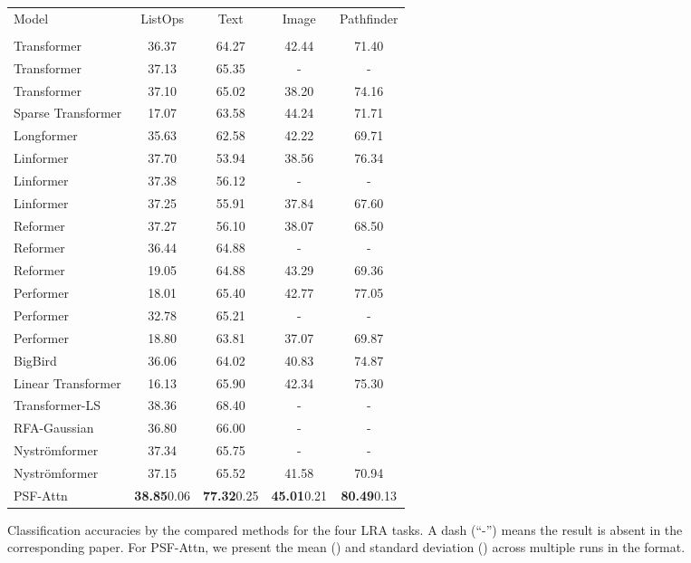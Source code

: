 \documentclass{article}
\begin{document}
\begin{figure}[t]
\begin{center}
\setlength\tabcolsep{5pt}
\begin{table*}[t]
\centering
\caption{Classification accuracies by the compared methods for the four LRA tasks. A dash (``-'') means the result is absent in the corresponding paper. For PSF-Attn, we present the mean () and standard deviation () across multiple runs in the  format.}
\label{tab:LRAacc}
\begin{tabular}{lcccc}
\hline\hline
Model              & ListOps & Text & Image & Pathfinder\\
                   &  &  &  & \\
\hline
Transformer \citep{tay2020long}    & 36.37 & 64.27 & 42.44 & 71.40\\
Transformer  \citep{zhu2021long}   & 37.13 & 65.35 & -     & -    \\
Transformer \citep{xiong2021nystr}    & 37.10 & 65.02 & 38.20 & 74.16\\
\hline
Sparse Transformer \citep{tay2020long}   & 17.07 & 63.58 & 44.24 & 71.71\\
\hline
Longformer \citep{tay2020long}     & 35.63 & 62.58 & 42.22 & 69.71\\
\hline
Linformer \citep{tay2020long}      & 37.70 & 53.94 & 38.56 & 76.34\\
Linformer \citep{zhu2021long}      & 37.38 & 56.12 & -     & -    \\
Linformer \citep{xiong2021nystr}      & 37.25 & 55.91 & 37.84 & 67.60\\
\hline
Reformer \citep{tay2020long}       & 37.27 & 56.10 & 38.07 & 68.50\\
Reformer \citep{zhu2021long}       & 36.44 & 64.88 & -     & -    \\
Reformer \citep{xiong2021nystr}       & 19.05 & 64.88 & 43.29 & 69.36\\
\hline
Performer \citep{tay2020long}      & 18.01 & 65.40 & 42.77 & 77.05\\
Performer \citep{zhu2021long}      & 32.78 & 65.21 & -     & -    \\
Performer \citep{xiong2021nystr}      & 18.80 & 63.81 & 37.07 & 69.87\\
\hline
BigBird \citep{tay2020long}        & 36.06 & 64.02 & 40.83 & 74.87\\
\hline
Linear Transformer \citep{tay2020long}  & 16.13 & 65.90 & 42.34 & 75.30\\
\hline
Transformer-LS \citep{zhu2021long} & 38.36 & 68.40 & -     & -    \\
\hline
RFA-Gaussian \citep{peng2021random}   & 36.80 & 66.00 & -     & -    \\
\hline
Nystr\"omformer \citep{zhu2021long}  & 37.34 & 65.75 & -     & -    \\
Nystr\"omformer \citep{xiong2021nystr}  & 37.15 & 65.52 & 41.58 & 70.94\\
\hline
PSF-Attn & \textbf{38.85}0.06 & \textbf{77.32}0.25 &  \textbf{45.01}0.21 & \textbf{80.49}0.13\\
\hline
\hline
\end{tabular}
\vspace{-3mm}
\end{table*}



\end{center}
\end{figure}
\end{document}
